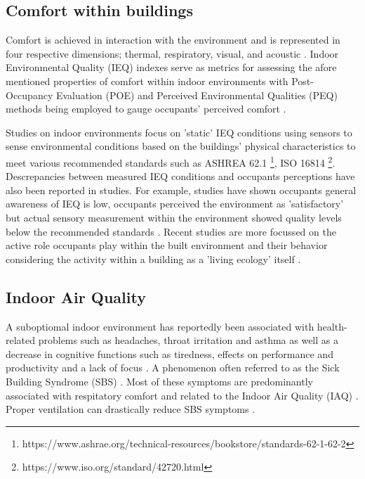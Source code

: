 \subsection{Comfort within buildings}

Comfort is achieved in interaction with the environment and is represented in four respective dimensions; thermal, respiratory, visual, and acoustic \cite{alavi_comfort_2017}. Indoor Environmental Quality (IEQ) \cite{kulshreshtha_indoor_2024} indexes serve as metrics for assessing the afore mentioned properties of comfort within indoor environments with Post-Occupancy Evaluation (POE) \cite{elsayed_post-occupancy_2023} and Perceived Environmental Qualities (PEQ) \cite{son_perceived_2023} methods being employed to gauge occupants' perceived comfort \cite{boissonneault_concepts_2023}. 

Studies on indoor environments focus on 'static' IEQ conditions using sensors to sense environmental conditions based on the buildings' physical characteristics to meet various recommended standards such as ASHREA 62.1 \footnote{https://www.ashrae.org/technical-resources/bookstore/standards-62-1-62-2}, ISO 16814 \footnote{https://www.iso.org/standard/42720.html}. Descrepancies between measured IEQ conditions and occupants perceptions have also been reported in studies. For example, studies have shown occupants general awareness of IEQ is low, occupants perceived the environment as 'satisfactory' but actual sensory measurement within the environment showed quality levels below the recommended standards \cite{son_perceived_2023}. Recent studies are more focussed on the active role occupants play within the built environment and their behavior considering the activity within a building as a 'living ecology' itself \cite{langevin_quantifying_2016}. 


\subsection{Indoor Air Quality}

A suboptiomal indoor environment has reportedly been associated with health-related problems such as headaches, throat irritation and asthma \cite{klepeis_national_2001} as well as a decrease in cognitive functions such as tiredness, effects on performance and productivity and a lack of focus \cite{wang_how_2021} \cite{du_indoor_2020}. A phenomenon often referred to as the Sick Building Syndrome (SBS) \cite{gawande_indoor_2020, passarelli_sick_2009}. Most of these symptoms are predominantly associated with respitatory comfort and related to the Indoor Air Quality (IAQ) \cite{kim_analyzing_2019}. Proper ventilation can drastically reduce SBS symptoms \cite{gawande_indoor_2020}.

